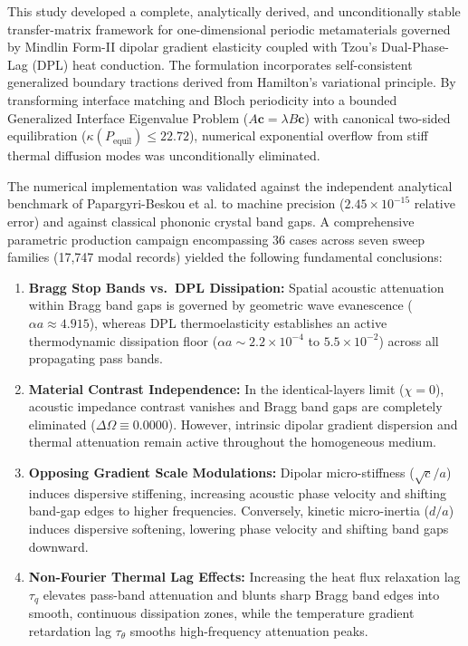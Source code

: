 \documentclass[11pt,a4paper]{article}
\begin{document}
This study developed a complete, analytically derived, and unconditionally stable transfer-matrix framework for one-dimensional periodic metamaterials governed by Mindlin Form-II dipolar gradient elasticity coupled with Tzou's Dual-Phase-Lag (DPL) heat conduction. The formulation incorporates self-consistent generalized boundary tractions derived from Hamilton's variational principle. By transforming interface matching and Bloch periodicity into a bounded Generalized Interface Eigenvalue Problem ($A\mathbf{c} = \lambda B\mathbf{c}$) with canonical two-sided equilibration ($\kappa(P_{\text{equil}}) \le 22.72$), numerical exponential overflow from stiff thermal diffusion modes was unconditionally eliminated.

The numerical implementation was validated against the independent analytical benchmark of Papargyri-Beskou et al. \cite{papargyribeskou2009wave} to machine precision ($2.45 \times 10^{-15}$ relative error) and against classical phononic crystal band gaps. A comprehensive parametric production campaign encompassing 36 cases across seven sweep families (17,747 modal records) yielded the following fundamental conclusions:
\begin{enumerate}
    \item \textbf{Bragg Stop Bands vs.\ DPL Dissipation:} Spatial acoustic attenuation within Bragg band gaps is governed by geometric wave evanescence ($\alpha a \approx 4.915$), whereas DPL thermoelasticity establishes an active thermodynamic dissipation floor ($\alpha a \sim 2.2 \times 10^{-4}$ to $5.5 \times 10^{-2}$) across all propagating pass bands.
    \item \textbf{Material Contrast Independence:} In the identical-layers limit ($\chi = 0$), acoustic impedance contrast vanishes and Bragg band gaps are completely eliminated ($\Delta\Omega \equiv 0.0000$). However, intrinsic dipolar gradient dispersion and thermal attenuation remain active throughout the homogeneous medium.
    \item \textbf{Opposing Gradient Scale Modulations:} Dipolar micro-stiffness ($\sqrt{c}/a$) induces dispersive stiffening, increasing acoustic phase velocity and shifting band-gap edges to higher frequencies. Conversely, kinetic micro-inertia ($d/a$) induces dispersive softening, lowering phase velocity and shifting band gaps downward.
    \item \textbf{Non-Fourier Thermal Lag Effects:} Increasing the heat flux relaxation lag $\tau_q$ elevates pass-band attenuation and blunts sharp Bragg band edges into smooth, continuous dissipation zones, while the temperature gradient retardation lag $\tau_\theta$ smooths high-frequency attenuation peaks.
\end{enumerate}
\end{document}
